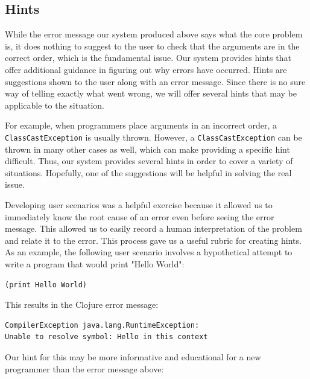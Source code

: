 \documentclass[12pt]{article}
\newcommand{\comment}[1]{{\bf \tt  {#1}}}
\newcommand{\emcomment}[1]{\textcolor{ForestGreen}{\comment{Elena: {#1}}}}
\begin{document}

\subsection{Hints}\label{sec:hints}

While the error message our system produced above says what the core problem is, it does nothing to suggest to the user to check that the arguments are in the correct order, which is the fundamental issue.
Our system provides hints that offer additional guidance in figuring out why errors have occurred.
Hints are suggestions shown to the user along with an error message.
Since there is no sure way of telling exactly what went wrong, we will offer several hints that may be applicable to the situation.

For example, when programmers place arguments in an incorrect order, a \texttt{ClassCastException} is usually thrown.
However, a \texttt{ClassCastException} can be thrown in many other cases as well, which can make providing a specific hint difficult.
Thus, our system provides several hints in order to cover a variety of situations.
Hopefully, one of the suggestions will be helpful in solving the real issue.

Developing user scenarios was a helpful exercise because it allowed us to immediately know the root cause of an error even before seeing the error message.
This allowed us to easily record a human interpretation of the problem and relate it to the error. This process gave us a useful rubric for creating hints. As an example, the following user scenario involves a hypothetical attempt to write a program that would print "Hello World":

\begin{verbatim}
(print Hello World)
\end{verbatim}

This results in the Clojure error message:
\begin{verbatim}
CompilerException java.lang.RuntimeException:
Unable to resolve symbol: Hello in this context
\end{verbatim}

Our hint for this may be more informative and educational for a new programmer than the error message above:
\end{document}
